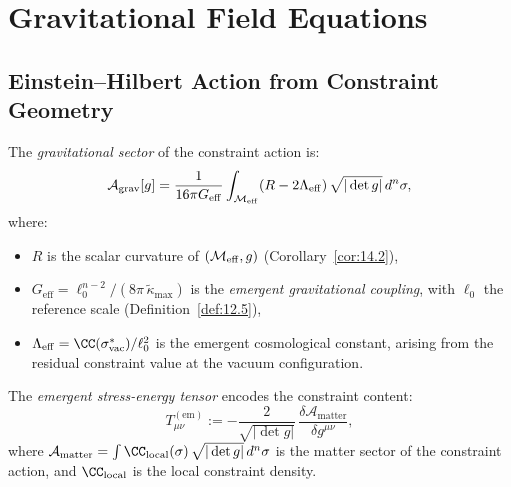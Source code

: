 \section{Gravitational Field Equations}
\label{sec:ch14:gravity}

\subsection{Einstein--Hilbert Action from Constraint Geometry}

\begin{definition}\label{def:14.7}
The \emph{gravitational sector} of the constraint action is:
\begin{equation}\label{eq:eh-action}
  \mathcal{A}_{\mathrm{grav}}[g] =
  \frac{1}{16\pi G_{\mathrm{eff}}}
  \int_{\mathcal{M}_{\mathrm{eff}}} (R - 2\Lambda_{\mathrm{eff}})
  \,\sqrt{|\det g|}\,d^n\sigma,
\end{equation}
where:
\begin{itemize}
  \item $R$ is the scalar curvature of $(\mathcal{M}_{\mathrm{eff}}, g)$
        (Corollary~\ref{cor:14.2}),
  \item $G_{\mathrm{eff}} = \ell_0^{n-2} / (8\pi\,\tilde{\kappa}_{\max})$
        is the \emph{emergent gravitational coupling}, with $\ell_0$ the
        reference scale (Definition~\ref{def:12.5}),
  \item $\Lambda_{\mathrm{eff}} = \CC(\sigma^*_{\mathrm{vac}})
        / \ell_0^2$ is the emergent cosmological constant, arising from
        the residual constraint value at the vacuum configuration.
\end{itemize}
\end{definition}

\begin{definition}\label{def:14.8}
The \emph{emergent stress-energy tensor} encodes the constraint
content:
\begin{equation}\label{eq:stress-energy}
  T_{\mu\nu}^{(\mathrm{em})}
  := -\frac{2}{\sqrt{|\det g|}}\,
  \frac{\delta \mathcal{A}_{\mathrm{matter}}}{\delta g^{\mu\nu}},
\end{equation}
where $\mathcal{A}_{\mathrm{matter}} = \int \CC_{\mathrm{local}}(\sigma)\,
\sqrt{|\det g|}\,d^n\sigma$ is the matter sector of the constraint
action, and $\CC_{\mathrm{local}}$ is the local constraint density.
\end{definition}

